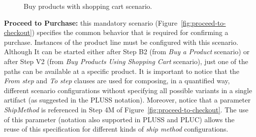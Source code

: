 \documentclass{acm_proc_article-sp}
\begin{document}
\begin{figure}[h]
\caption{Buy products with shopping cart scenario.}
\label{fig:buy-product-changing-flow}
\end{figure}

{\bf Proceed to Purchase:} this mandatory scenario (Figure~\ref{fig:proceed-to-checkout}) specifies the common behavior that is required for confirming a purchase. Instances of the product line must be configured with this scenario. Although It can be started  either after Step B2 (from \emph{Buy a Product} scenario) or after Step V2 (from \emph{Buy Products Using Shopping Cart} scenario), just one of the paths can be available at a specific product. 
It is important to notice that the \emph{From step} and \emph{To step} clauses are used for composing, in a quantified way, different scenario configurations without specifying all possible variants in a single artifact (as suggested in the PLUSS notation). Moreover, notice that a parameter \emph{ShipMethod} is referenced in Step 4M of Figure~\ref{fig:proceed-to-checkout}. The use of this parameter (notation also supported in PLUSS and PLUC) allows the reuse of this specification 
for different kinds of \emph{ship method} configurations. 
\end{document}
